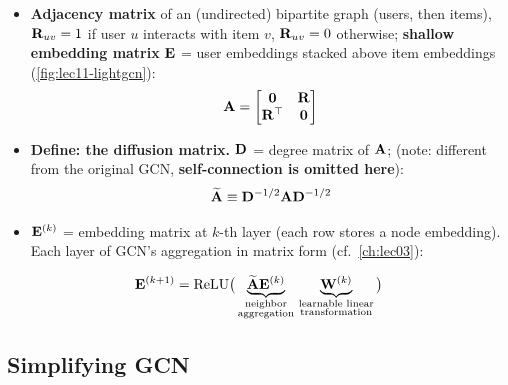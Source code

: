 \begin{itemize}
  \item \textbf{Adjacency matrix} of an (undirected) bipartite graph (users,
    then items), $\mathbf{R}_{uv}=1$ if user $u$ interacts with item $v$,
    $\mathbf{R}_{uv}=0$ otherwise; \textbf{shallow embedding matrix} $\mathbf{E}$ = user
    embeddings stacked above item embeddings (\cref{fig:lec11-lightgcn}):
    \begin{equation}\label{eq:lec11-adj}
      \mathbf{A}=\begin{bmatrix}\mathbf{0}&\mathbf{R}\\ \mathbf{R}^{\top}&\mathbf{0}\end{bmatrix}
    \end{equation}
  \item \textbf{Define: the diffusion matrix.} $\mathbf{D}$ = degree matrix of $\mathbf{A}$;
     (note: different from the original GCN,
    \textbf{self-connection is omitted here}):
    \begin{equation}\label{eq:lec11-diffusion}
      \widetilde{\mathbf{A}}\equiv\mathbf{D}^{-1/2}\mathbf{A}\mathbf{D}^{-1/2}
    \end{equation}
  \item $\mathbf{E}^{(k)}$ = embedding matrix at $k$-th layer (each row stores a node
    embedding). Each layer of GCN's aggregation in matrix form (cf.\
    \cref{ch:lec03}):
\end{itemize}
\begin{equation}\label{eq:lec11-gcn-matrix}
  \mathbf{E}^{(k+1)}=\mathrm{ReLU}\big(\underbrace{\widetilde{\mathbf{A}}\mathbf{E}^{(k)}}_{\substack{\text{neighbor}\\
  \text{aggregation}}}\,\underbrace{\mathbf{W}^{(k)}}_{\substack{\text{learnable linear}\\
  \text{transformation}}}\big)
\end{equation}

\subsection{Simplifying GCN}\label{sec:lec11-simplify}

